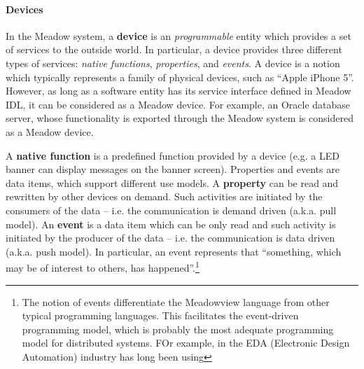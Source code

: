 \documentclass{note}
\begin{document}
\paragraph{Devices}
In the Meadow system, a \textcolor{blue2}{\bf{}device} is an {\em
  programmable\/} entity which provides a set of services to the outside
world. In particular, a device provides three different types of services:
{\em native functions\/}, {\em 
  properties}, and {\em events}. A device is a notion which typically
represents a family of physical devices, such as ``Apple iPhone 5''. However,
as long as a software entity has its service interface defined in Meadow IDL,
it can be considered as a Meadow device. For example, an Oracle
database server, whose functionality is exported through the Meadow system is
considered as a Meadow device.


A \textcolor{blue2}{\bf{}native function} is a predefined function provided by
a device (e.g. a LED banner can display messages on the banner screen). 
Properties and events are data items, which support different use models.
A \textcolor{blue2}{\bf{}property} can be read and rewritten by other devices
on demand. Such activities are initiated by the consumers of the data --
i.e. the communication is demand driven (a.k.a. pull model).
An \textcolor{blue2}{\bf{}event} is a data item which can be only
read and such activity is initiated by the producer of the data -- i.e. the
communication is data driven (a.k.a. push model). 
In particular, an event represents that ``something, which may be of interest
to others, has happened''.\footnote{The notion of events differentiate the
Meadowview language from other typical programming languages. This
facilitates the event-driven programming model, which is probably the 
most adequate programming model for distributed systems. FOr example, in the
EDA (Electronic Design Automation) industry has long been using }

\end{document}
